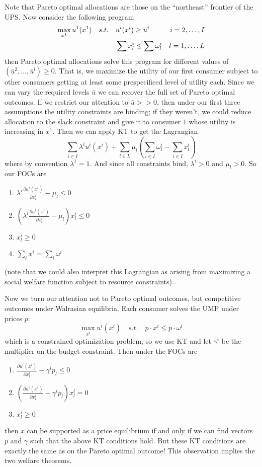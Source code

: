 Note that Pareto optimal allocations are those on the ``northeast''
frontier of the UPS. Now consider the following program
\begin{align}
  \max_{x^1} u^1(x^1) \quad s.t. & \quad u^i(x^i) \geq \bar u^i 
  & i = 2, \dots, I \notag \\
  & \quad \sum x^i_l \leq \sum \omega^i_l & l = 1, \dots, L \notag
\end{align}
then Pareto optimal allocations solve this program for different
values of $(\bar u^2, \dots, \bar u^l) \geq 0$. That is, we maximize
the utility of our first consumer subject to other consumers getting
at least some prespecificed level of utility each. Since we can vary
the required levels $\bar u$ we can recover the full set of Pareto
optimal outcomes. If we restrict our attention to $\bar u >> 0$, then
under our first three assumptions the utility constraints are binding;
if they weren't, we could reduce allocation to the slack constraint
and give it to consumer $1$ whose utility is increasing in $x^1$. Then
we can apply KT to get the Lagrangian
\[
\sum_{i \in I} \lambda^iu^i(x^i) 
+ \sum_{l \in L} \mu_l \left( \sum_{i \in I}\omega^i_l -  \sum_{i \in I} x^i_l \right)
\]
where by convention $\lambda^1 = 1$. And since all constraints bind,
$\lambda^i > 0$ and $\mu_l > 0$. So our FOCs are
\begin{enumerate}
\item $\lambda^i \frac{\partial u^i(x^i)}{\partial x^i_l} - \mu_l \leq 0$
\item $\left(\lambda^i \frac{\partial u^i(x^i)}{\partial x^i_l} -
    \mu_l\right)x^i_l \leq 0$
\item $x^i_l \geq 0$
\item $\sum_i x^i = \sum_i \omega^i$
\end{enumerate}
(note that we could also interpret this Lagrangian as arising from
maximizing a social welfare function subject to resource constraints).

Now we turn our attention not to Pareto optimal outcomes, but
competitive outcomes under Walrasian equilibria. Each consumer solves
the UMP under prices $p$:
\[
\max_{x^i} u^i(x^i) \quad s.t. \quad p \cdot x^i \leq p \cdot \omega^i
\]
which is a constrained optimization problem, so we use KT and let
$\gamma^i$ be the multiplier on the budget constraint. Then under
the FOCs are
\begin{enumerate}
\item $\frac{\partial u^i(x^i)}{\partial x^i_l} - \gamma^ip_l \leq 0$
\item $\left(\frac{\partial u^i(x^i)}{\partial x^i_l} -
    \gamma^ip_l\right)x^l_l = 0$
\item $x^i_l \geq 0$
\end{enumerate}
then $x$ can be supported as a price equilibrium if and only if we can
find vectors $p$ and $\gamma$ such that the above KT conditions
hold. But these KT conditions are exactly the same as on the Pareto
optimal outcome! This observation implies the two
welfare theorems.

